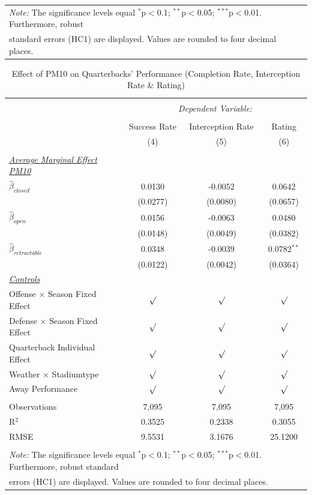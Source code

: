 \documentclass[12pt,a4paper]{article}
\begin{document}
{\begin{table}[!htbp]
\begin{tabular}{@{\extracolsep{5pt}}lccc}
\multicolumn{4}{l}{\footnotesize \textit{Note:} The significance levels equal {$^{*}$p$<$0.1; $^{**}$p$<$0.05; $^{***}$p$<$0.01}.  Furthermore, robust} \\ \multicolumn{4}{l}{\footnotesize standard errors (HC1) are displayed. Values are rounded to four decimal places.}
  \end{tabular}
\end{table} 
\clearpage
\begin{table}[!htbp] \centering 
  \caption{Effect of PM10 on Quarterbacks' Performance (Completion Rate, Interception Rate \& Rating)} 
  \label{T1} 
\begin{tabular}{@{\extracolsep{5pt}}lccc} 
\\[-1.8ex]\hline 
\hline \\[-1.8ex] 
 & \multicolumn{3}{c}{\textit{Dependent Variable:}} \\ \cline{2-4} \\ [-1.8ex]
 & Success Rate & Interception Rate & Rating \\ 
  & (4) & (5) & (6)\\ \hline \\[-1.8ex] 
 \underline{\textit{Average Marginal Effect PM10}}\\[0.4cm]
  $\hat{\beta}_{closed}$& 0.0130 & -0.0052 & 0.0642 \\ 
  & (0.0277)  & (0.0080)& (0.0657) \\[0.4cm]
  $\hat{\beta}_{open}$&  0.0156 & -0.0063 & 0.0480\\ 
  & (0.0148) & (0.0049) & (0.0382) \\[0.4cm]
  $\hat{\beta}_{retractable}$& 0.0348 & -0.0039 & 0.0782$^{**}$\\ 
  & (0.0122) & (0.0042) & (0.0364)\\ [0.4cm]
  \underline{\textit{Controls}} \\[0.4cm]
  Offense $\times$ Season Fixed Effect & $\surd$ & $\surd$ & $\surd$ \\[0.4cm]
   Defense $\times$ Season Fixed Effect & $\surd$ & $\surd$  & $\surd$ \\[0.4cm]
    Quarterback Individual Effect & $\surd$ & $\surd$ & $\surd$  \\[0.4cm]
    Weather $\times $ Stadiumtype & $\surd$ & $\surd$ & $\surd$ \\[0.4cm]
    Away Performance & $\surd$ & $\surd$ & $\surd$\\
\hline \\[-1.8ex] 
Observations & 7,095 & 7,095 & 7,095 \\ 
R$^{2}$ & 0.3525 & 0.2338   &  0.3055 \\ 
RMSE & 9.5531 & 3.1676  & 25.1200 \\ \hline 
\hline \\[-1.8ex] 
\multicolumn{4}{l}{\footnotesize \textit{Note:} The significance levels equal {$^{*}$p$<$0.1; $^{**}$p$<$0.05; $^{***}$p$<$0.01}.  Furthermore, robust  standard} \\ \multicolumn{4}{l}{\footnotesize errors (HC1) are displayed. Values are rounded to four decimal places.}
  \end{tabular}
\end{table} 
}
\end{document}
